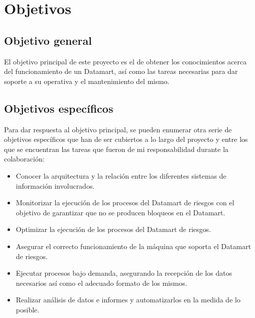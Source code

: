 \documentclass[a4paper, 12pt]{book}
\begin{document}

\cleardoublepage
\chapter{Objetivos}
\label{chap:objetivos}

\section{Objetivo general}
\label{sec:objetivo-general}
El objetivo principal de este proyecto es el de obtener los conocimientos acerca del funcionamiento de un Datamart, así como las tareas necesarias para dar soporte a su operativa y el mantenimiento del mismo.

\section{Objetivos específicos}
\label{sec:objetivos-especificos}
Para dar respuesta al objetivo principal, se pueden enumerar otra serie de objetivos específicos que han de ser cubiertos a lo largo del proyecto y entre los que se encuentran las tareas que fueron de mi responsabilidad durante la colaboración:

\begin{itemize}
	\item Conocer la arquitectura y la relación entre los diferentes sistemas de información involucrados.
	
	\item Monitorizar la ejecución de los procesos del Datamart de riesgos con el objetivo de garantizar que no se producen bloqueos en el Datamart.
	
	\item Optimizar la ejecución de los procesos del Datamart de riesgos.
	
	\item Asegurar el correcto funcionamiento de la máquina que soporta el Datamart de riesgos.
	
	\item Ejecutar procesos bajo demanda, asegurando la recepción de los datos necesarios así como el adecuado formato de los mismos.
	
	\item Realizar análisis de datos e informes y automatizarlos en la medida de lo posible.
\end{itemize}
\end{document}

